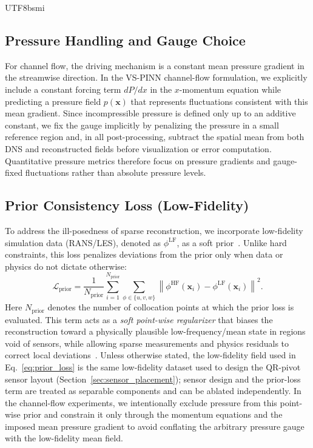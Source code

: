 \documentclass[master]{NTHUthesis}
\begin{document}
\begin{CJK*}{UTF8}{bsmi}
\subsection{Pressure Handling and Gauge Choice}
For channel flow, the driving mechanism is a constant mean pressure gradient in the streamwise direction. In the VS-PINN channel-flow formulation, we explicitly include a constant forcing term $dP/dx$ in the $x$-momentum equation while predicting a pressure field $p(\mathbf{x})$ that represents fluctuations consistent with this mean gradient. Since incompressible pressure is defined only up to an additive constant, we fix the gauge implicitly by penalizing the pressure in a small reference region and, in all post-processing, subtract the spatial mean from both DNS and reconstructed fields before visualization or error computation. Quantitative pressure metrics therefore focus on pressure gradients and gauge-fixed fluctuations rather than absolute pressure levels.

\subsection{Prior Consistency Loss (Low-Fidelity)}
To address the ill-posedness of sparse reconstruction, we incorporate low-fidelity simulation data (RANS/LES), denoted as $\phi^{\text{LF}}$, as a soft prior~\cite{Psaros2023JCP}. Unlike hard constraints, this loss penalizes deviations from the prior only when data or physics do not dictate otherwise:
\begin{equation}
    \label{eq:prior_loss}
    \mathcal{L}_{\text{prior}} = \frac{1}{N_{\text{prior}}} \sum_{i=1}^{N_{\text{prior}}} \sum_{\phi \in \{u,v,w\}} \left\| \phi^{\text{HF}}(\mathbf{x}_i) - \phi^{\text{LF}}(\mathbf{x}_i) \right\|^2.
\end{equation}
Here $N_{\text{prior}}$ denotes the number of collocation points at which the prior loss is evaluated. This term acts as a \emph{soft point-wise regularizer} that biases the reconstruction toward a physically plausible low-frequency/mean state in regions void of sensors, while allowing sparse measurements and physics residuals to correct local deviations~\cite{Xu2022}.
Unless otherwise stated, the low-fidelity field used in Eq.~\eqref{eq:prior_loss} is the same low-fidelity dataset used to design the QR-pivot sensor layout (Section~\ref{sec:sensor_placement}); sensor design and the prior-loss term are treated as separable components and can be ablated independently.
In the channel-flow experiments, we intentionally exclude pressure from this point-wise prior and constrain it only through the momentum equations and the imposed mean pressure gradient to avoid conflating the arbitrary pressure gauge with the low-fidelity mean field.


\end{CJK*}
\end{document}
